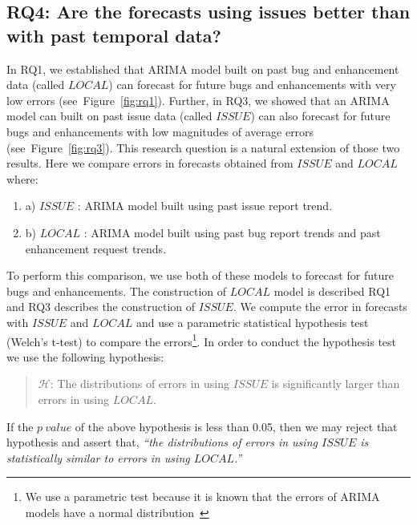 \documentclass[sigconf, preprint]{acmart}
\newcommand{\be}{\begin{enumerate}}
\newcommand{\ee}{\end{enumerate}}
\newcommand{\fig}[1]{Figure~\ref{fig:#1}}
\begin{document}
\subsection*{\normalsize{RQ4: Are the forecasts using issues better than with past temporal data?}}


In RQ1, we established that ARIMA model built on past bug and enhancement data (called $\mathit{LOCAL}$) can forecast for future bugs and enhancements with very low errors (see~\fig{rq1}). Further, in RQ3, we showed that an ARIMA model can built on past issue data (called $\mathit{ISSUE}$) can also forecast for future bugs and enhancements with low magnitudes of average errors (see~\fig{rq3}). This research question is a natural extension of those two results. Here we compare errors in forecasts obtained from $\mathit{ISSUE}$ and $\mathit{LOCAL}$ where: 
\be
\item[] a) $\mathit{ISSUE}$ : ARIMA model built using past issue report trend.
\item[] b) $\mathit{LOCAL}$ : ARIMA model built using past bug report trends 
and past enhancement request trends.
\ee

To perform this comparison, we use both of these models to forecast for future bugs and enhancements. 
The construction of $\mathit{LOCAL}$ model is described RQ1 and RQ3 describes 
the construction of $\mathit{ISSUE}$. We compute the error in forecasts with  
$\mathit{ISSUE}$ and $\mathit{LOCAL}$ and use a parametric statistical hypothesis test 
(Welch's t-test) to compare the errors\footnote{We use a parametric test 
because it is known that the errors of ARIMA models have a normal 
distribution~\cite{box2015time}}. In order to conduct the hypothesis test we use the following hypothesis:
\begin{quote}
$\mathcal{H}$: The distributions of errors in using $\mathit{ISSUE}$ is significantly larger
than errors in using $\mathit{LOCAL}$.
\end{quote}

If the $p~value$ of the above hypothesis is less than 0.05, then we may reject 
that hypothesis and assert that, \textit{``the distributions of errors in using $\mathit{ISSUE}$ is statistically similar to errors in using $\mathit{LOCAL}$.''}
\end{document}
